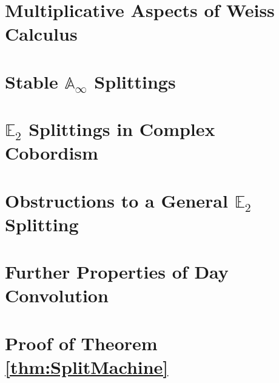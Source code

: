 \documentclass[reqno, oneside]{amsart}
\theoremstyle{definition}
\theoremstyle{plain}
\begin{document}
 

\section{Multiplicative Aspects of Weiss Calculus} \label{sec:MultWeiss}



\section{Stable \texorpdfstring{$\mathbb{A}_\infty$}{Aoo} Splittings} \label{sec:AooSplit}



\section{\texorpdfstring{$\mathbb{E}_2$}{E2} Splittings in Complex Cobordism} \label{sec:MUE2}



\section{Obstructions to a General \texorpdfstring{$\mathbb{E}_2$}{E2} Splitting} \label{sec:Obstruction}



\appendix

\section{Further Properties of Day Convolution}\label{app:day}



\section{Proof of Theorem \ref{thm:SplitMachine}}\label{app:SplittingMachine}




%
\end{document}
